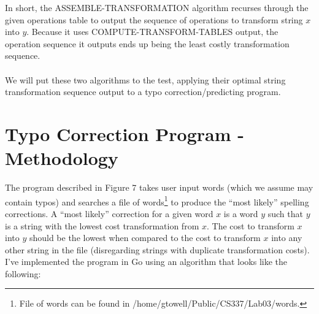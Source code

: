 \documentclass[12pt,letterpaper]{article}
\begin{document}
In short, the ASSEMBLE-TRANSFORMATION algorithm recurses through the given operations table to output the sequence of operations to transform string $x$ into $y$. Because it uses COMPUTE-TRANSFORM-TABLES output, the operation sequence it outputs ends up being the least costly transformation sequence.
\paragraph{}
We will put these two algorithms to the test, applying their optimal string transformation sequence output to a typo correction/predicting program.


\section{Typo Correction Program - Methodology}
The program described in Figure 7 takes user input words (which we assume may contain typos) and searches a file of words\footnote[2]{File of words can be found in /home/gtowell/Public/CS337/Lab03/words.} to produce the “most likely” spelling corrections. A “most likely” correction for a given word $x$ is a word $y$ such that $y$ is a string with the lowest cost transformation from $x$. The cost to transform $x$ into $y$ should be the lowest when compared to the cost to transform $x$ into any other string in the file (disregarding strings with duplicate transformation costs). I’ve implemented the program in Go using an algorithm that looks like the following:
\end{document}
